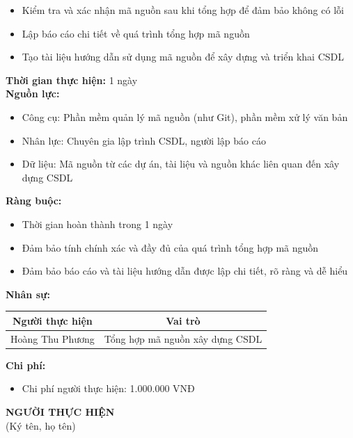 {\begin{minipage}{\textwidth}
\begin{itemize}
        \item Kiểm tra và xác nhận mã nguồn sau khi tổng hợp để đảm bảo không có lỗi
        \item Lập báo cáo chi tiết về quá trình tổng hợp mã nguồn
        \item Tạo tài liệu hướng dẫn sử dụng mã nguồn để xây dựng và triển khai CSDL
    \end{itemize}
    \vspace{0.5cm}
    \noindent \textbf{Thời gian thực hiện:} 1 ngày \\
    \noindent \textbf{Nguồn lực:}
    \begin{itemize}
        \item Công cụ: Phần mềm quản lý mã nguồn (như Git), phần mềm xử lý văn bản
        \item Nhân lực: Chuyên gia lập trình CSDL, người lập báo cáo
        \item Dữ liệu: Mã nguồn từ các dự án, tài liệu và nguồn khác liên quan đến xây dựng CSDL
    \end{itemize}
    \vspace{0.5cm}
    \noindent \textbf{Ràng buộc:}
    \begin{itemize}
        \item Thời gian hoàn thành trong 1 ngày
        \item Đảm bảo tính chính xác và đầy đủ của quá trình tổng hợp mã nguồn
        \item Đảm bảo báo cáo và tài liệu hướng dẫn được lập chi tiết, rõ ràng và dễ hiểu
    \end{itemize}
    \vspace{0.5cm}
    \noindent \textbf{Nhân sự:}
    \begin{longtable}{|c|c|}
    \hline
    \textbf{Người thực hiện} & \textbf{Vai trò} \\
    \hline
    Hoàng Thu Phương & Tổng hợp mã nguồn xây dựng CSDL \\
    \hline
    \end{longtable}
    \vspace{0.5cm}
    \noindent \textbf{Chi phí:}
    \begin{itemize}
        \item Chi phí người thực hiện: 1.000.000 VNĐ
    \end{itemize}
    \vspace{1cm}
    \begin{flushleft}
        \hspace{8cm} \textbf{NGƯỜI THỰC HIỆN} \\
        \hspace{8.8cm} (Ký tên, họ tên) \\
        \vspace{1cm}
    \end{flushleft}
    \end{minipage}
}
% 
